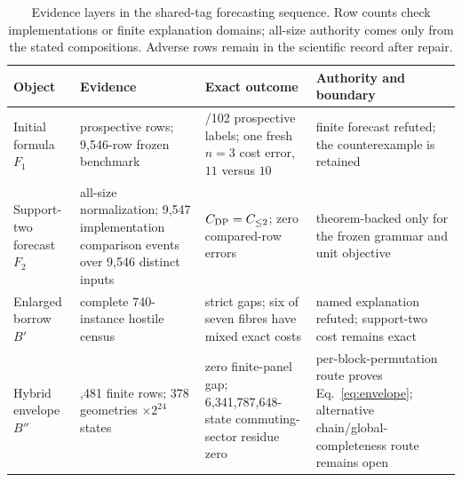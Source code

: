 \begin{table}[t]
\centering
\caption{Evidence layers in the shared-tag forecasting sequence.  Row counts check implementations or finite explanation domains; all-size authority comes only from the stated compositions.  Adverse rows remain in the scientific record after repair.}
\label{tab:forecast-chain}
\begin{tabularx}{\textwidth}{@{}>{\raggedright\arraybackslash}p{}>{\raggedright\arraybackslash}p{}>{\raggedright\arraybackslash}p{}>{\raggedright\arraybackslash}X@{}}
\toprule
Object & Evidence & Exact outcome & Authority and boundary \\
\midrule
Initial formula $F_1$ & 102 prospective rows; 9,546-row frozen benchmark & 102/102 prospective labels; one fresh $n=3$ cost error, $11$ versus $10$ & finite forecast refuted; the counterexample is retained \\
Support-two forecast $F_2$ & all-size normalization; 9,547 implementation comparison events over 9,546 distinct inputs & $C_{\rm DP}=C_{\le2}$; zero compared-row errors & theorem-backed only for the frozen grammar and unit objective \\
Enlarged borrow $B'$ & complete 740-instance hostile census & 64 strict gaps; six of seven fibres have mixed exact costs & named explanation refuted; support-two cost remains exact \\
Hybrid envelope $B''$ & 10,481 finite rows; 378 geometries $\times2^{24}$ states & zero finite-panel gap; 6,341,787,648-state commuting-sector residue zero & per-block-permutation route proves Eq.~\eqref{eq:envelope}; alternative chain/global-completeness route remains open \\
\bottomrule
\end{tabularx}
\end{table}

